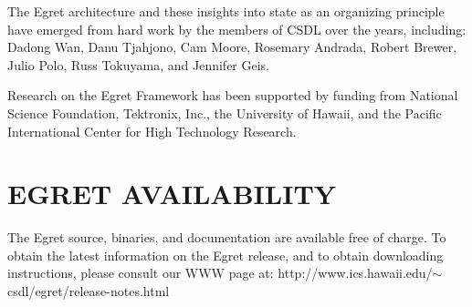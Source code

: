 The Egret architecture and these insights into state as an organizing
principle have emerged from hard work by the members of CSDL over the
years, including: Dadong Wan, Danu Tjahjono, Cam Moore, Rosemary Andrada,
Robert Brewer, Julio Polo, Russ Tokuyama, and Jennifer Geis.

Research on the Egret Framework has been supported by funding from National
Science Foundation, Tektronix, Inc., the University of Hawaii, and the
Pacific International Center for High Technology Research.

\section{EGRET AVAILABILITY}

The Egret source, binaries, and documentation are available free of charge.
To obtain the latest information
on the Egret release, and to obtain downloading instructions, please 
consult our WWW page at: \newline 
http://www.ics.hawaii.edu/$\sim$csdl/egret/release-notes.html


\newpage





